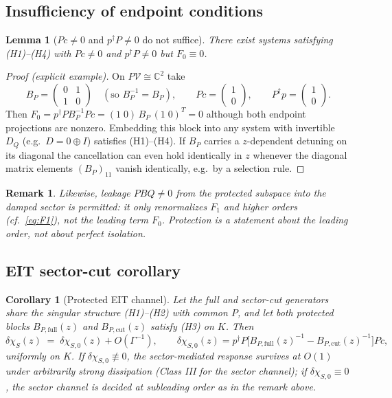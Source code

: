 \documentclass[11pt]{article}
\newtheorem{lemma}{Lemma}
\newtheorem{corollary}{Corollary}
\newtheorem{remark}{Remark}
\begin{document}
\subsection{Insufficiency of endpoint conditions}

\begin{lemma}[$Pc\ne0$ and $p^\dagger P\ne0$ do not suffice]
\label{lem:counterexample}
There exist systems satisfying (H1)--(H4) with $Pc\ne0$ and
$p^\dagger P\ne0$ but $F_0\equiv0$.
\end{lemma}

\begin{proof}[Proof (explicit example)]
On $P\mathcal V\cong\mathbb C^2$ take
\[
B_P=\begin{pmatrix}0&1\\ 1&0\end{pmatrix}
\quad(\text{so } B_P^{-1}=B_P),\qquad
Pc=\begin{pmatrix}1\\0\end{pmatrix},\qquad
P^\dagger p=\begin{pmatrix}1\\0\end{pmatrix}.
\]
Then $F_0=p^\dagger PB_P^{-1}Pc=(1\;0)\,B_P\,(1\;0)^T=0$ although both
endpoint projections are nonzero. Embedding this block into any system with
invertible $D_Q$ (e.g.\ $D=0\oplus I$) satisfies (H1)--(H4). If $B_P$ carries
a $z$-dependent detuning on its diagonal the cancellation can even hold
identically in $z$ whenever the diagonal matrix elements
$(B_P)_{11}$ vanish identically, e.g.\ by a selection rule.
\end{proof}

\begin{remark}
Likewise, leakage $PBQ\ne0$ from the protected subspace into the damped sector
is \emph{permitted}: it only renormalizes $F_1$ and higher orders
(cf.\ \eqref{eq:F1}), not the leading term $F_0$. Protection is a statement
about the leading order, not about perfect isolation.
\end{remark}

\subsection{EIT sector-cut corollary}

\begin{corollary}[Protected EIT channel]
\label{cor:eit}
Let the full and sector-cut generators share the singular structure
(H1)--(H2) with common $P$, and let both protected blocks
$B_{P,\mathrm{full}}(z)$ and $B_{P,\mathrm{cut}}(z)$ satisfy (H3) on $K$.
Then
\[
\delta\chi_S(z)\;=\;\delta\chi_{S,0}(z)+O(\Gamma^{-1}),
\qquad
\delta\chi_{S,0}(z)
=p^\dagger P\bigl[B_{P,\mathrm{full}}(z)^{-1}
 -B_{P,\mathrm{cut}}(z)^{-1}\bigr]Pc ,
\]
uniformly on $K$. If $\delta\chi_{S,0}\not\equiv0$, the sector-mediated
response survives at $O(1)$ under arbitrarily strong dissipation
(Class III for the sector channel); if $\delta\chi_{S,0}\equiv0$, the sector
channel is decided at subleading order as in the remark above.
\end{corollary}
\end{document}
